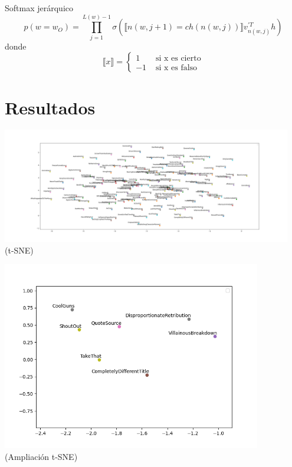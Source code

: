 \documentclass{beamer}
\begin{document}
\begin{frame}{Softmax jerárquico}
	\begin{equation}\label{eq:soft}
		p\left( w=w_O \right) = \prod_{j=1}^{L(w)-1}\sigma\left( \llbracket n(w, j+1)=ch(n(w,j))\rrbracket v^{'T}_{n(w,j)}h \right)
	\end{equation}
	donde
	\begin{equation}
		\llbracket x \rrbracket = \begin{cases}
			1 & \text{ si x es cierto} \\
			-1 & \text{ si x es falso}
		\end{cases}
	\end{equation}
\end{frame}

\section{Resultados}

\begin{frame}
	\begin{center}
		\includegraphics[width=0.95\textwidth,keepaspectratio]{tsne_full.png}
		\\
		\footnotesize(t-SNE)
    \end{center}
\end{frame}

\begin{frame}
	\begin{center}
		\includegraphics[width=0.85\textwidth,keepaspectratio]{tsne.png}
		\\
		\footnotesize(Ampliación t-SNE)
    \end{center}
\end{frame}
\end{document}
